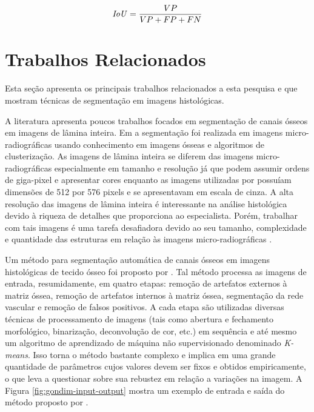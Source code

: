 \begin{equation}
\mbox{\textit{IoU}} = \frac{VP}{VP + FP + FN}
\label{eq-iou}
\end{equation}

\section{Trabalhos Relacionados}
Esta seção apresenta os principais trabalhos relacionados a esta pesquisa e que mostram técnicas de segmentação em imagens histológicas.

A literatura apresenta poucos trabalhos focados em segmentação de canais ósseos em imagens de lâmina inteira. Em \cite{liu1999bone} a segmentação foi realizada em imagens micro-radiográficas usando conhecimento em imagens ósseas e algoritmos de clusterização. As imagens de lâmina inteira se diferem das imagens micro-radiográficas especialmente em tamanho e resolução já que podem assumir ordens de giga-pixel e apresentar cores enquanto as imagens utilizadas por \cite{liu1999bone} possuíam dimensões de 512 por 576 pixels e se apresentavam em escala de cinza. A alta resolução das imagens de lâmina inteira é interessante na análise histológica devido à riqueza de detalhes que proporciona ao especialista. Porém, trabalhar com tais imagens é uma tarefa desafiadora devido ao seu tamanho, complexidade e quantidade das estruturas em relação às imagens micro-radiográficas \cite{gondim2021automatic}. 


Um método para segmentação automática de canais ósseos em imagens histológicas de tecido ósseo foi proposto por \cite{gondim2021automatic}. 
Tal método processa as imagens de entrada, resumidamente, em quatro etapas: remoção de artefatos externos à matriz óssea, remoção de artefatos internos à matriz óssea, segmentação da rede vascular e remoção de falsos positivos. A cada etapa são utilizadas diversas técnicas de processamento de imagens (tais como abertura e fechamento morfológico, binarização, deconvolução de cor, etc.) em sequência e até mesmo um algoritmo de aprendizado de máquina não supervisionado denominado \textit{K-means}. Isso torna o método bastante complexo e implica em uma grande quantidade de parâmetros cujos valores devem ser fixos e obtidos empiricamente, o que leva a questionar sobre sua rebustez em relação a variações na imagem. A Figura \ref{fig:gondim-input-output} mostra um exemplo de entrada e saída do método proposto por \cite{gondim2021automatic}.

